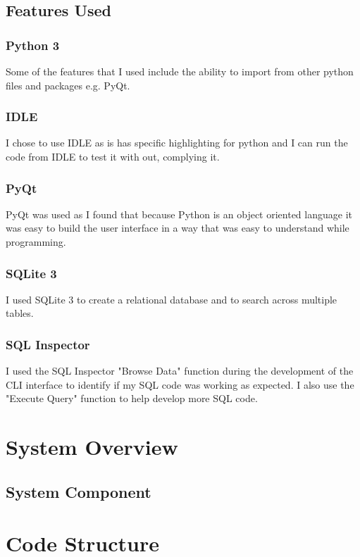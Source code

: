 \subsection{Features Used}
\subsubsection{Python 3}
Some of the features that I used include the ability to import from other python files and packages e.g. PyQt.
\subsubsection{IDLE}
I chose to use IDLE as is has specific highlighting for python and I can run the code from IDLE to test it with out, complying it.
\subsubsection{PyQt}
PyQt was used as I found that because Python is an object oriented language it was easy to build the user interface in a way that was easy to understand while programming.
\subsubsection{SQLite 3}
I used SQLite 3 to create a relational database and to search across multiple tables.
\subsubsection{SQL Inspector}
I used the SQL Inspector "Browse Data" function during the development of the CLI interface to identify if my SQL code was working as expected. I also use the "Execute Query" function to help develop more SQL code.

\section{System Overview}


\subsection{System Component}

\section{Code Structure}

